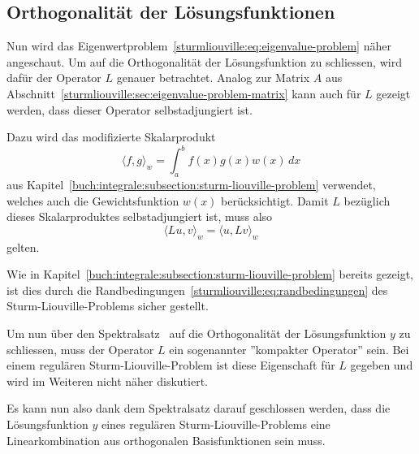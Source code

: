 \subsection{Orthogonalität der Lösungsfunktionen}

Nun wird das Eigenwertproblem~\eqref{sturmliouville:eq:eigenvalue-problem} näher
angeschaut.
Um auf die Orthogonalität der Lösungsfunktion zu schliessen, wird dafür der
Operator $L$ genauer betrachtet.
Analog zur Matrix $A$ aus 
Abschnitt~\ref{sturmliouville:sec:eigenvalue-problem-matrix} kann auch für
$L$ gezeigt werden, dass dieser Operator selbstadjungiert ist.

Dazu wird das modifizierte Skalarprodukt
\begin{equation}
    \label{sturmliouville:eq:modified-dot-product}
    \langle f, g \rangle_w
    =
    \int_a^b f(x)g(x)w(x)\,dx
\end{equation}
aus Kapitel~\ref{buch:integrale:subsection:sturm-liouville-problem} verwendet,
welches auch die Gewichtsfunktion $w(x)$ berücksichtigt.
Damit $L$ bezüglich dieses Skalarproduktes selbstadjungiert ist, muss also
\[
    \langle L u, v\rangle_w
    =
    \langle u, L v\rangle_w
\]
gelten.

Wie in Kapitel~\ref{buch:integrale:subsection:sturm-liouville-problem} bereits
gezeigt, ist dies durch die
Randbedingungen~\eqref{sturmliouville:eq:randbedingungen} des
Sturm-Liouville-Problems sicher gestellt.

Um nun über den Spektralsatz~\cite{sturmliouville:spektralsatz-wiki} auf die
Orthogonalität der Lösungsfunktion $y$ zu schliessen, muss der Operator $L$ ein
sogenannter ''kompakter Operator'' sein.
Bei einem regulären Sturm-Liouville-Problem ist diese Eigenschaft für $L$
gegeben und wird im Weiteren nicht näher diskutiert.

Es kann nun also dank dem Spektralsatz darauf geschlossen werden, dass die
Lösungsfunktion $y$ eines regulären Sturm-Liouville-Problems eine
Linearkombination aus orthogonalen Basisfunktionen sein muss.
